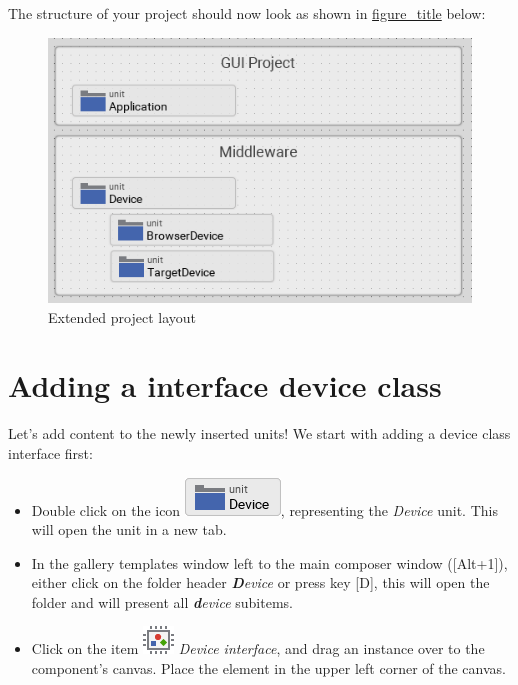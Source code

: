 \documentclass[
  a4paper,
,tablecaptionabove
]{scrbook}
\begin{document}
The structure of your project should now look as shown in
\protect\hyperlink{fig:ExtendedProjectLayout}{figure\_title} below:

\begin{figure}
\centering
\includegraphics{./../asciidoc/modules/ROOT/assets/images/deviceintegration/ProjectStructure.png}
\caption{Extended project layout}
\end{figure}

\hypertarget{_adding_a_interface_device_class}{%
\section{Adding a interface device
class}\label{_adding_a_interface_device_class}}

Let's add content to the newly inserted units! We start with adding a
device class interface first:

\begin{itemize}
\item
  Double click on the icon
  \includegraphics{./../asciidoc/modules/ROOT/assets/images/icons/DeviceUnitIcon.png},
  representing the \emph{Device} unit. This will open the unit in a new
  tab.
\item
  In the gallery templates window left to the main composer window
  ({[}Alt+1{]}), either click on the folder header
  \emph{\textbf{D}evice} or press key {[}D{]}, this will open the
  folder and will present all \emph{\textbf{d}evice} subitems.
\item
  Click on the item
  \includegraphics{./../asciidoc/modules/ROOT/assets/images/icons/DeviceInterfaceIcon.png}
  \emph{Device interface}, and drag an instance over to the component's
  canvas. Place the element in the upper left corner of the canvas.
\end{itemize}
\end{document}
